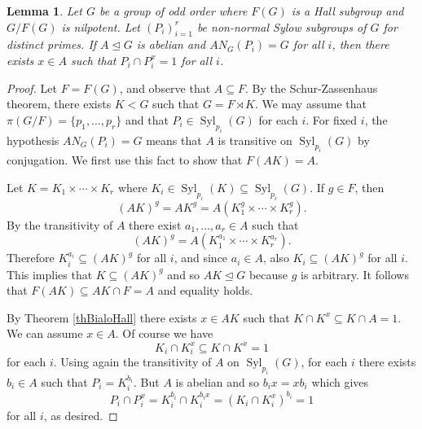 \documentclass[10pt,a4paper]{amsart}
\newtheorem{lemma}{Lemma}
\newcommand{\Syl}{\mathop{\mathrm{Syl}}}
\begin{document}
\begin{lemma} \label{lem:key}
Let $G$ be a group of odd order where $F(G)$ is a Hall subgroup and $G/F(G)$ is nilpotent.
Let $(P_i)_{i=1}^r$ be non-normal Sylow subgroups of $G$ for distinct primes.
If $A \unlhd G$ is abelian and $AN_G(P_i)=G$ for all $i$,
then there exists $x \in A$ such that $P_i \cap P_i^x =1$ for all $i$.
\end{lemma}

\begin{proof}
Let $F=F(G)$, and observe that $A \subseteq F$.
By the Schur-Zassenhaus theorem, there exists $K<G$ such that $G= F \rtimes K$.
We may assume that $\pi(G/F) = \{p_1,\ldots,p_r\}$ and that $P_i \in \Syl_{p_i}(G)$ for each $i$.
For fixed $i$, the hypothesis $A N_G(P_i)=G$ means that $A$ is transitive on $\Syl_{p_i}(G)$ by conjugation.
We first use this fact to show that $F(AK)=A$.

Let $K=K_1 \times \cdots \times K_r$ where $K_i \in \Syl_{p_i}(K) \subseteq \Syl_{p_i}(G)$.
If $g \in F$, then
$$ (AK)^g = AK^g = A(K_1^g \times \cdots \times K_r^g) . $$
By the transitivity of $A$ there exist $a_1,\ldots,a_r \in A$ such that
$$ (AK)^g = A(K_1^{a_1} \times \cdots \times K_r^{a_r}) . $$
Therefore $K_i^{a_i} \subseteq (AK)^g$ for all $i$, and since $a_i \in A$,
also $K_i \subseteq (AK)^g$ for all $i$.
This implies that $K \subseteq (AK)^g$ and so $AK \unlhd G$ because $g$ is arbitrary.
It follows that $F(AK) \subseteq AK \cap F = A$ and equality holds.

By Theorem \ref{thBialoHall} there exists $x \in AK$ such that $K \cap K^x \subseteq K \cap A =1$.
We can assume $x\in A$.
Of course we have
$$ K_i \cap K_i^x \subseteq K \cap K^x = 1 $$
for each $i$.
Using again the transitivity of $A$ on $\Syl_{p_i}(G)$, for each $i$ there exists $b_i\in A$ such that $P_i=K_i^{b_i}$.
But $A$ is abelian and so $b_i x = x b_i$ which gives
$$ P_i \cap P_i^x = K_i^{b_i} \cap K_i^{b_i x} = (K_i \cap K_i^x)^{b_i} = 1 $$
for all $i$, as desired.
\end{proof}
\end{document}
